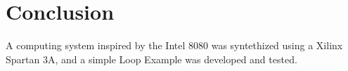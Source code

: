 \section{Conclusion} \label{sec:concl}
A computing system inspired by the Intel 8080 was syntethized using a Xilinx Spartan 3A, and a simple Loop Example was
developed and tested.